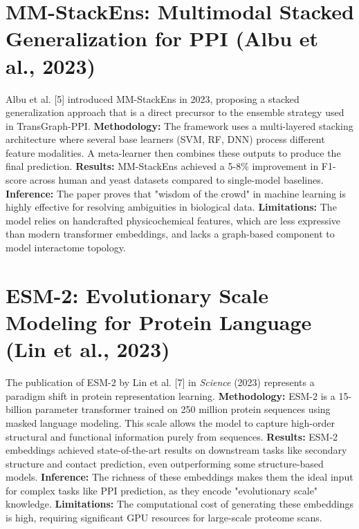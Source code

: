 \documentclass[12pt,a4paper]{report}
\begin{document}
\section{MM-StackEns: Multimodal Stacked Generalization for PPI (Albu et al., 2023)}
Albu et al. [5] introduced MM-StackEns in 2023, proposing a stacked generalization approach that is a direct precursor to the ensemble strategy used in TransGraph-PPI.
\textbf{Methodology:} The framework uses a multi-layered stacking architecture where several base learners (SVM, RF, DNN) process different feature modalities. A meta-learner then combines these outputs to produce the final prediction.
\textbf{Results:} MM-StackEns achieved a 5-8\% improvement in F1-score across human and yeast datasets compared to single-model baselines.
\textbf{Inference:} The paper proves that "wisdom of the crowd" in machine learning is highly effective for resolving ambiguities in biological data.
\textbf{Limitations:} The model relies on handcrafted physicochemical features, which are less expressive than modern transformer embeddings, and lacks a graph-based component to model interactome topology.

\section{ESM-2: Evolutionary Scale Modeling for Protein Language (Lin et al., 2023)}
The publication of ESM-2 by Lin et al. [7] in \textit{Science} (2023) represents a paradigm shift in protein representation learning.
\textbf{Methodology:} ESM-2 is a 15-billion parameter transformer trained on 250 million protein sequences using masked language modeling. This scale allows the model to capture high-order structural and functional information purely from sequences.
\textbf{Results:} ESM-2 embeddings achieved state-of-the-art results on downstream tasks like secondary structure and contact prediction, even outperforming some structure-based models.
\textbf{Inference:} The richness of these embeddings makes them the ideal input for complex tasks like PPI prediction, as they encode "evolutionary scale" knowledge.
\textbf{Limitations:} The computational cost of generating these embeddings is high, requiring significant GPU resources for large-scale proteome scans.
\end{document}
